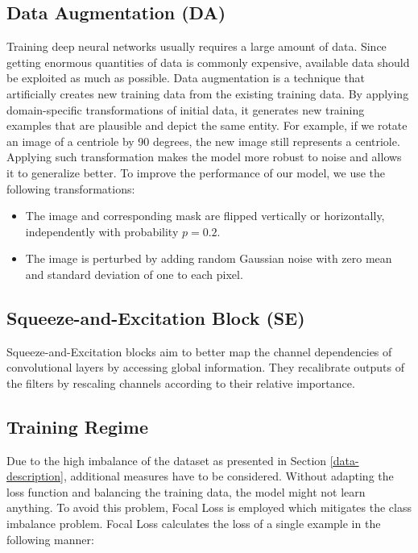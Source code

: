 \documentclass[9pt,conference,compsocconf, article]{IEEEtran}
\begin{document}
\subsection{Data Augmentation (DA)}
\label{data-augmentation}

Training deep neural networks usually requires a large amount of data. Since getting enormous quantities of data is commonly expensive, available data should be exploited as much as possible. Data augmentation is a technique that artificially creates new training data from the existing training data. By applying domain-specific transformations of initial data, it generates new training examples that are plausible and depict the same entity. For example, if we rotate an image of a centriole by 90 degrees, the new image still represents a centriole. Applying such transformation makes the model more robust to noise and allows it to generalize better. To improve the performance of our model, we use the following transformations:
\begin{itemize}
    \item The image and corresponding mask are flipped vertically or horizontally, independently with probability $p=0.2$.   
    \item The image is perturbed by adding random Gaussian noise with zero mean and standard deviation of one to each pixel. 
\end{itemize}




\subsection{Squeeze-and-Excitation Block (SE)}
\label{se-block}

Squeeze-and-Excitation blocks \cite{hu2018squeeze} aim to better map the channel dependencies of convolutional layers by accessing global information. They recalibrate outputs of the filters by rescaling channels according to their relative importance.



\subsection{Training Regime}
\label{training-regime}

Due to the high imbalance of the dataset as presented in Section \ref{data-description}, additional measures have to be considered. Without adapting the loss function and balancing the training data, the model might not learn anything. To avoid this problem, Focal Loss \cite{lin2017focal} is employed which mitigates the class imbalance problem. Focal Loss calculates the loss of a single example in the following manner:
\end{document}
